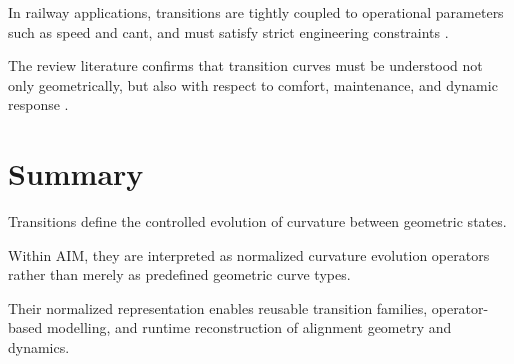 In railway applications, transitions are tightly coupled to operational
parameters such as speed and cant, and must satisfy strict engineering
constraints
\cite{Kufver2000RailwayAlignment,Klein1998Trassierung}.

The review literature confirms that transition curves must be understood
not only geometrically, but also with respect to comfort, maintenance,
and dynamic response
\cite{BrustadDalmo2020Review}.

\section{Summary}

\begin{summary}
Transitions define the controlled evolution of curvature between
geometric states.

Within AIM, they are interpreted as normalized curvature evolution
operators rather than merely as predefined geometric curve types.

Their normalized representation enables reusable transition families,
operator-based modelling, and runtime reconstruction of alignment
geometry and dynamics.
\end{summary}

